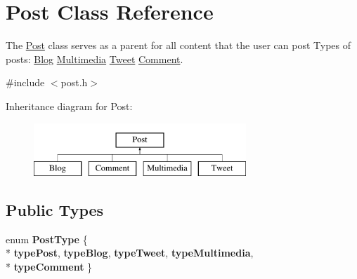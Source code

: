 \hypertarget{classPost}{}\section{Post Class Reference}
\label{classPost}


The \hyperlink{classPost}{Post} class serves as a parent for all content that the user can post Types of posts\+: \hyperlink{classBlog}{Blog} \hyperlink{classMultimedia}{Multimedia} \hyperlink{classTweet}{Tweet} \hyperlink{classComment}{Comment}.  




{\ttfamily \#include $<$post.\+h$>$}

Inheritance diagram for Post\+:\begin{figure}[H]
\begin{center}
\leavevmode
\includegraphics[height=2.000000cm]{classPost}
\end{center}
\end{figure}
\subsection*{Public Types}
\begin{DoxyCompactItemize}
\item 
enum {\bfseries Post\+Type} \{ \\*
{\bfseries type\+Post}, 
{\bfseries type\+Blog}, 
{\bfseries type\+Tweet}, 
{\bfseries type\+Multimedia}, 
\\*
{\bfseries type\+Comment}
 \}\hypertarget{classPost_a686f0f53eaf20e9b1995aef7337ab882}{}\label{classPost_a686f0f53eaf20e9b1995aef7337ab882}

\end{DoxyCompactItemize}
